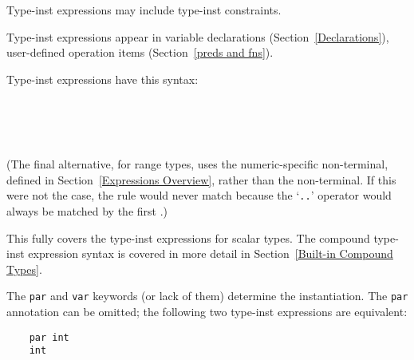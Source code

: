 \documentclass[10pt]{scrartcl}
\begin{document}
Type-inst expressions may include type-inst constraints.

Type-inst expressions appear in variable declarations
(Section~\ref{Declarations}), user-defined operation items
(Section~\ref{preds and fns}).%

Type-inst expressions have this syntax:
\begin{productions}
    \RuleTIExpr \\
    \RuleBaseTIExpr \\
    \RuleVarPar \\
    \RuleBaseTIExprTail
\end{productions}


(The final alternative, for range types, uses the numeric-specific
 non-terminal, defined in Section~\ref{Expressions Overview},
rather than the  non-terminal.  If this were not the case, the rule
would never match because the `\texttt{..}' operator would always be matched
by the first .)

This fully covers the type-inst expressions for scalar types.  The compound
type-inst expression syntax is covered in more detail in
Section~\ref{Built-in Compound Types}.  


The \texttt{par} and \texttt{var} keywords (or lack of them) determine the
instantiation.  The \texttt{par} annotation can be omitted;  the following
two type-inst expressions are equivalent:
\begin{verbatim}
    par int
    int
\end{verbatim}

\end{document}
